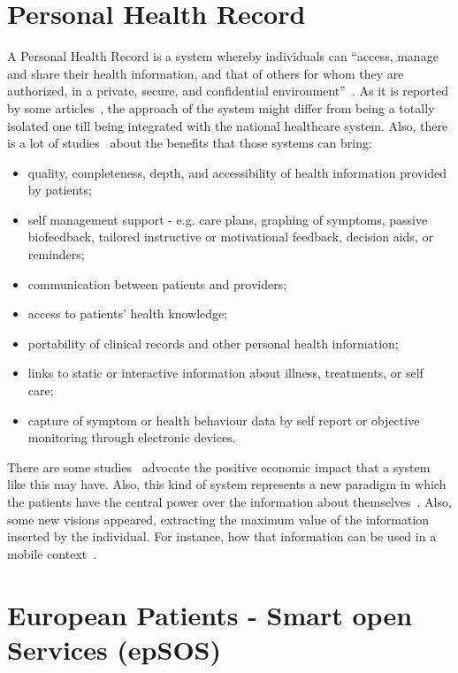 \section{Personal Health Record}

A Personal Health Record is a system whereby individuals can ``access, manage and share their health information, and that of others for whom they are authorized, in a private, secure, and confidential environment''~\citep{Health2003}. As it is reported by some articles~\citep{Tang2006,Tang2009}, the approach of the system might differ from being a totally isolated one till being integrated with the national healthcare system. Also, there is a lot of studies~\cite{Tang2009,Pagliari2007,Detmer2008, Fricton2008} about the benefits that those systems can bring:
\begin{itemize}
\item quality, completeness, depth, and accessibility of health information provided by patients;
\item self management support - e.g. care plans, graphing of symptoms, passive biofeedback, tailored instructive or motivational feedback, decision aids, or reminders;
\item communication between patients and providers;
\item access to patients' health knowledge;
\item portability of clinical records and other personal health information;
\item links to static or interactive information about illness, treatments, or self care;
\item capture of symptom or health behaviour data by self report or objective monitoring through electronic devices.
\end{itemize}

There are some studies~\cite{Kaelber2008,Gearon2007} advocate the positive economic impact that a system like this may have. Also, this kind of system represents a new paradigm in which the patients have the central power over the information about themselves~\citep{Ball2007}. Also, some new visions appeared, extracting the maximum value of the information inserted by the individual. For instance, how that information can be used in a mobile context~\citep{Brief2010}.






\section{European Patients - Smart open Services (epSOS)} \label{sec:epsos}

